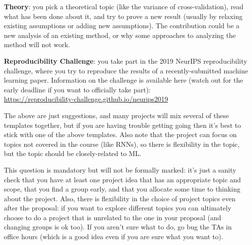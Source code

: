 \documentclass{article}
\def\blu#1{{\color{blu}#1}}
\begin{document}
{\item \textbf{Theory}: you pick a theoretical topic (like the variance of cross-validation), read what has been done about it, and try to prove a new result (usually by relaxing existing assumptions or adding new assumptions). The contribution could be a new analysis of an existing method, or why some approaches to analyzing the method will not work.
\item \textbf{Reproducibility Challenge}: you take part in the 2019 NeurIPS reproducibility challenge, where you try to reproduce the results of a recently-submitted machine learning paper. Information on the challenge is available here (watch out for the early deadline if you want to officially take part): \\\url{https://reproducibility-challenge.github.io/neurips2019}
}
The above are just suggestions, and many projects will mix several of these templates together, but if you are having trouble getting going then it's best to stick with one of the above templates. Also note that the project can focus on topics not covered in the course (like RNNs), so there is flexibility in the topic, but the topic should be closely-related to ML.

\blu{This question is mandatory but will not be formally marked: it's just a sanity check that you have at least one project idea that has an appropriate topic and scope, that you find a group early, and that you  allocate some time to thinking about the project.} 
Also, there is flexibility in the choice of project topics even after the proposal: if you want to explore different topics you can ultimately choose to do a project that is unrelated to the one in your proposal (and changing groups is ok too). If you aren't sure what to do, go bug the TAs in office hours (which is a good idea even if you are sure what you want to).
\end{document}
